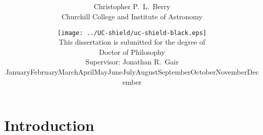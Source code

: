 \documentclass[a4paper, 11pt, titlepage, twoside]{book}
\def\today{\number\day\space\ifcase\month\or January\or February\or March\or April\or May\or June\or July\or August\or September\or October\or November\or December\fi\space\number\year}
\begin{document}
\title{\vspace{0.7cm}
\hrulefill\hspace{0.2cm}\raisebox{-4pt}{\aldineright \aldineleft}\hspace{0.2cm}\hrulefill\\
\\
\vspace{1mm}\hrulefill\hspace{0.2cm}\raisebox{-4pt}{\aldineright \aldineleft}\hspace{0.2cm}\hrulefill}

\author{{\LARGE{}Christopher P.\ L.\ Berry}\vspace{2mm}\\
Churchill College and Institute of Astronomy\\
\vspace{1mm}}

\date{\texttt{[image: ../UC-shield/uc-shield-black.eps]}\vspace{14mm}
\\{This dissertation is submitted for the degree of}\vspace{1mm}\\{\sc\LARGE{}Doctor of Philosophy}\vspace{3mm}
\\{\Large{}Supervisor: Jonathan R.\ Gair}\vspace{11mm}
\\{\Large\today}}

\maketitle
{}









\tableofcontents

\mainmatter

\part{Introduction}
\end{document}
